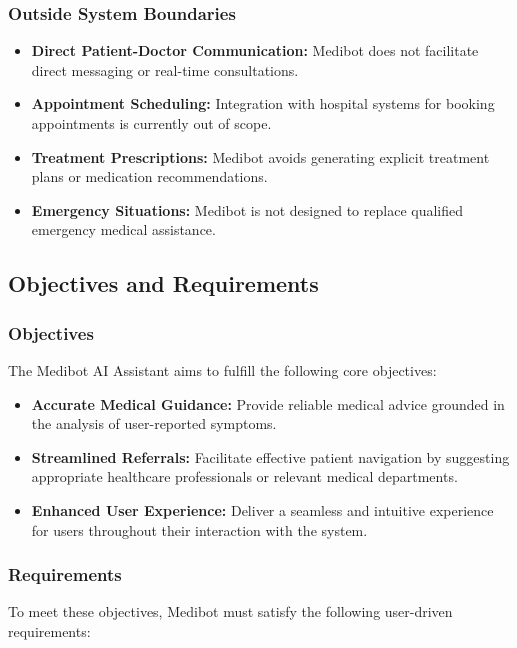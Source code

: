 \subsubsection{Outside System Boundaries}

\begin{itemize}
    \item \textbf{Direct Patient-Doctor Communication:} Medibot does not facilitate direct messaging or real-time consultations.
    \item \textbf{Appointment Scheduling:} Integration with hospital systems for booking appointments is currently out of scope.
    \item \textbf{Treatment Prescriptions:} Medibot avoids generating explicit treatment plans or medication recommendations.
    \item \textbf{Emergency Situations:} Medibot is not designed to replace qualified emergency medical assistance. 
\end{itemize}


\subsection{Objectives and Requirements} 


\subsubsection{Objectives}

The Medibot AI Assistant aims to fulfill the following core objectives:
\begin{itemize}
    \item \textbf{Accurate Medical Guidance:}  Provide reliable medical advice grounded in the analysis of user-reported symptoms.
    \item \textbf{Streamlined Referrals:}  Facilitate effective patient navigation by suggesting appropriate healthcare professionals or relevant medical departments. 
    \item \textbf{Enhanced User Experience:} Deliver a seamless and intuitive experience for users throughout their interaction with the system.
\end{itemize}


\subsubsection{Requirements}

To meet these objectives, Medibot must satisfy the following user-driven requirements:

